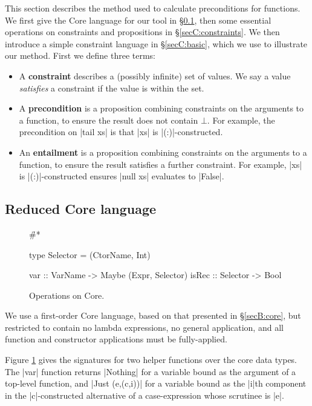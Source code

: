 This section describes the method used to calculate preconditions for functions. We first give the Core language for our tool in \S\ref{secC:catch_core}, then some essential operations on constraints and propositions in \S\ref{secC:constraints}. We then introduce a simple constraint language in \S\ref{secC:basic}, which we use to illustrate our method. First we define three terms:

\begin{itemize}
\item A \textbf{constraint} describes a (possibly infinite) set of values. We say a value \textit{satisfies} a constraint if the value is within the set.
\item A \textbf{precondition} is a proposition combining constraints on the arguments to a function, to ensure the result does not contain $\bot{}$. For example, the precondition on |tail xs| is that |xs| is |(:)|-constructed.
\item An \textbf{entailment}  is a proposition combining constraints on the arguments to a function, to ensure the result satisfies a further constraint. For example, |xs| is |(:)|-constructed ensures |null xs| evaluates to |False|.
\end{itemize}

\subsection{Reduced Core language}
\label{secC:catch_core}

\begin{figure}
\h{#*}\begin{code}
type Selector  =  (CtorName, Int)

var    :: VarName   -> Maybe (Expr, Selector)
isRec  :: Selector  -> Bool
\end{code}
\caption{Operations on Core.}
\label{figC:catch_core_operations}
\end{figure}

We use a first-order Core language, based on that presented in \S\ref{secB:core}, but restricted to contain no lambda expressions, no general application, and all function and constructor applications must be fully-applied.

Figure \ref{figC:catch_core_operations} gives the signatures for two helper functions over the core data types. The |var| function returns |Nothing| for a variable bound as the argument of a top-level function, and |Just (e,(c,i))| for a variable bound as the |i|th component in the |c|-constructed alternative of a case-expression whose scrutinee is |e|.

